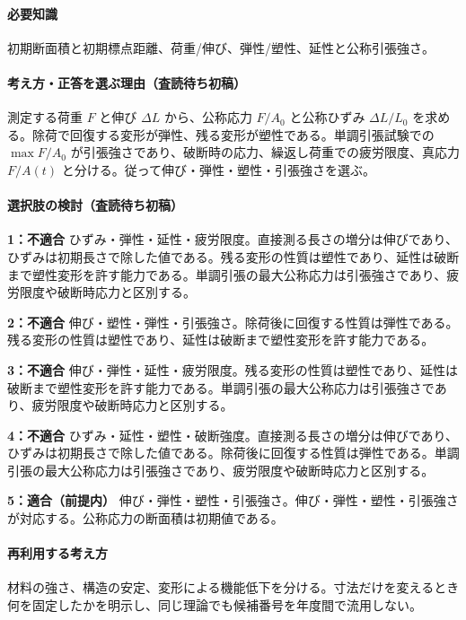 \paragraph{必要知識} 初期断面積と初期標点距離、荷重/伸び、弾性/塑性、延性と公称引張強さ。

\paragraph{考え方・正答を選ぶ理由（査読待ち初稿）} 測定する荷重 \(F\) と伸び \(\Delta L\) から、公称応力 \(F/A_0\) と公称ひずみ \(\Delta L/L_0\) を求める。除荷で回復する変形が弾性、残る変形が塑性である。単調引張試験での \(\max F/A_0\) が引張強さであり、破断時の応力、繰返し荷重での疲労限度、真応力 \(F/A(t)\) と分ける。従って伸び・弾性・塑性・引張強さを選ぶ。

\paragraph{選択肢の検討（査読待ち初稿）}\mbox{}\par

\noindent\textbf{1：不適合} ひずみ・弾性・延性・疲労限度。直接測る長さの増分は伸びであり、ひずみは初期長さで除した値である。残る変形の性質は塑性であり、延性は破断まで塑性変形を許す能力である。単調引張の最大公称応力は引張強さであり、疲労限度や破断時応力と区別する。\par

\noindent\textbf{2：不適合} 伸び・塑性・弾性・引張強さ。除荷後に回復する性質は弾性である。残る変形の性質は塑性であり、延性は破断まで塑性変形を許す能力である。\par

\noindent\textbf{3：不適合} 伸び・弾性・延性・疲労限度。残る変形の性質は塑性であり、延性は破断まで塑性変形を許す能力である。単調引張の最大公称応力は引張強さであり、疲労限度や破断時応力と区別する。\par

\noindent\textbf{4：不適合} ひずみ・延性・塑性・破断強度。直接測る長さの増分は伸びであり、ひずみは初期長さで除した値である。除荷後に回復する性質は弾性である。単調引張の最大公称応力は引張強さであり、疲労限度や破断時応力と区別する。\par

\noindent\textbf{5：適合（前提内）} 伸び・弾性・塑性・引張強さ。伸び・弾性・塑性・引張強さが対応する。公称応力の断面積は初期値である。\par

\paragraph{再利用する考え方} 材料の強さ、構造の安定、変形による機能低下を分ける。寸法だけを変えるとき何を固定したかを明示し、同じ理論でも候補番号を年度間で流用しない。

